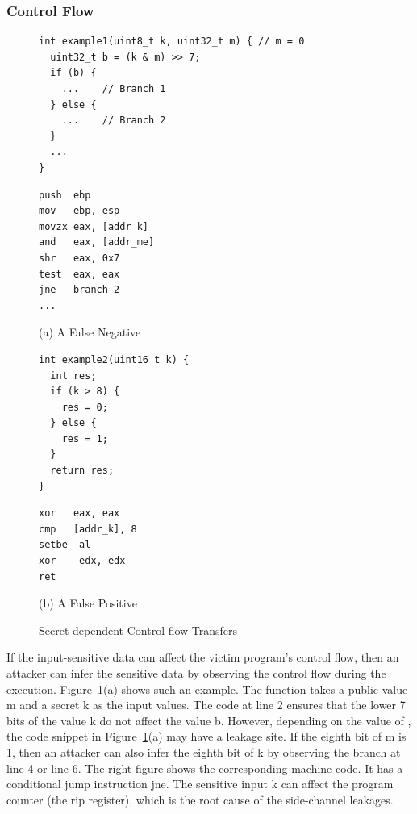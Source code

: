\subsubsection{Control Flow}
\begin{figure}[h]
  \begin{minipage}{0.45\linewidth}
    \begin{lstlisting}[xleftmargin=.0\textwidth, xrightmargin=.0\textwidth, frame=none]
int example1(uint8_t k, uint32_t m) { // m = 0
  uint32_t b = (k & m) >> 7;
  if (b) {
    ...    // Branch 1
  } else {
    ...    // Branch 2
  }
  ...
}
\end{lstlisting}
  \end{minipage}
  \hfill
  \begin{minipage}{0.45\linewidth}
    \begin{lstlisting}[xleftmargin=.0\textwidth, xrightmargin=.00\textwidth, frame=none, numbers=none, mathescape=true]
push  ebp
mov   ebp, esp
movzx eax, [addr_k]    
and   eax, [addr_me] 
shr   eax, 0x7           
test  eax, eax
jne   branch 2
...
\end{lstlisting}
  \end{minipage}\caption*{(a) A False Negative}

  \begin{minipage}{0.45\linewidth}
    \begin{lstlisting}[xleftmargin=.0\textwidth, xrightmargin=.0\textwidth, frame=none]
int example2(uint16_t k) {
  int res;
  if (k > 8) {
    res = 0;
  } else {
    res = 1;
  }
  return res;
}
\end{lstlisting}
  \end{minipage}
  \hfill
  \begin{minipage}{0.45\linewidth}
    \begin{lstlisting}[xleftmargin=.0\textwidth, xrightmargin=.00\textwidth, frame=none, numbers=none, mathescape=true]
xor   eax, eax
cmp   [addr_k], 8
setbe  al
xor    edx, edx
ret
\end{lstlisting}
  \end{minipage}\caption*{(b) A False Positive}
  \caption{Secret-dependent Control-flow Transfers}\label{fig:chapter3:cf}
\end{figure}

If the input-sensitive data can affect the victim program's control flow, then an attacker can infer the sensitive data by observing the control flow during the execution. Figure~\ref{fig:chapter3:cf}(a) shows such an example. The function takes a public value \textsf{m} and a secret \textsf{k} as the input values. The code at line 2 ensures that the lower 7 bits of the value \textsf{k} do not affect the value \textsf{b}. However, depending on the value of , the code snippet in Figure~\ref{fig:chapter3:cf}(a) may have a leakage site. If the eighth bit of \textsf{m} is 1, then an attacker can also infer the eighth bit of \textsf{k} by observing the branch at line 4 or line 6. The right figure shows the corresponding machine code. It has a conditional jump instruction \textsf{jne}. The sensitive input \textsf{k} can affect the program counter (the rip register), which is the root cause of the side-channel leakages.


